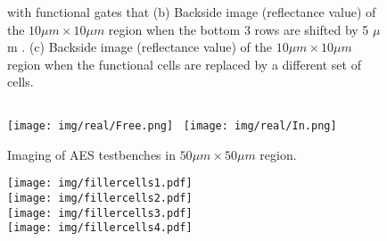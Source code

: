 \documentclass{beamer}
\begin{document}
\begin{columns}
\begin{column}[T]{0.33\textwidth}
\begin{figure}[t]
\begin{columns}
{                        with functional gates that (b) Backside image (reflectance value) of the
                        $10\mu m \times 10\mu m$ region when the bottom 3 rows
                        are shifted by 5 $\mu$m .  
                        (c) Backside image (reflectance
                        value) of the $10\mu m \times 10\mu m$ region when the
                        functional cells are replaced by a different set of
                        cells.
                        }
                    \end{columns}
                \end{figure} 
                \begin{figure}[h]
                     \centering
                         \texttt{[image: img/real/Free.png]}~
                         \texttt{[image: img/real/In.png]}
                     \caption{
                         Imaging of AES testbenches in $50\mu m \times 50\mu m $
                         region.
                         }
                     \label{imaging_result}
                 \end{figure}
                \begin{figure}[ht]
                    \begin{center}
                        \texttt{[image: img/fillercells1.pdf]}\\
                        \texttt{[image: img/fillercells2.pdf]}\\
                        \texttt{[image: img/fillercells3.pdf]}\\
                        \texttt{[image: img/fillercells4.pdf]}\\

\end{center}
\end{figure}
\end{column}
\end{columns}
\end{document}
